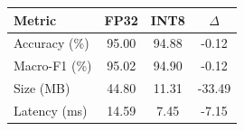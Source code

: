 \begin{tabular}{lccc}\toprule
Metric & FP32 & INT8 & $\Delta$\\\midrule
Accuracy (\%) & 95.00 & 94.88 & -0.12\\
Macro-F1 (\%) & 95.02 & 94.90 & -0.12\\
Size (MB) & 44.80 & 11.31 & -33.49\\
Latency (ms) & 14.59 & 7.45 & -7.15\\
\bottomrule\end{tabular}